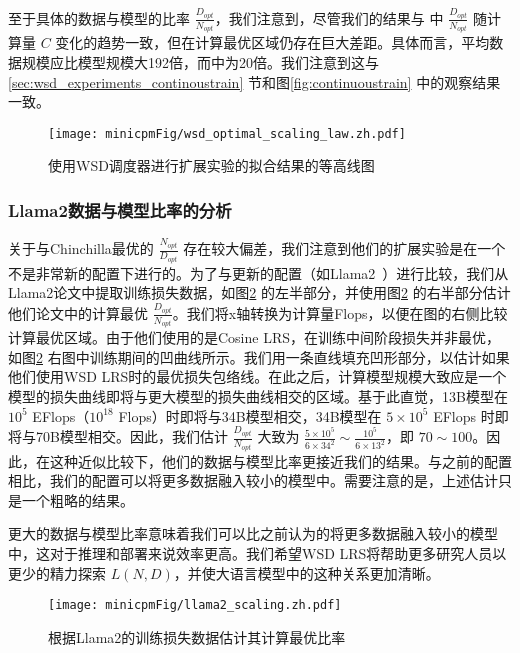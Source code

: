 至于具体的数据与模型的比率 $\frac{D_{opt}}{N_{opt}}$，我们注意到，尽管我们的结果与 \citet{hoffmann2022training} 中 $\frac{D_{opt}}{N_{opt}}$ 随计算量 $C$ 变化的趋势一致，但在计算最优区域仍存在巨大差距。具体而言，平均数据规模应比模型规模大192倍，而\citet{hoffmann2022training}中为20倍。我们注意到这与\ref{sec:wsd_experiments_continoustrain} 节和图\ref{fig:continuoustrain} 中的观察结果一致。




\begin{figure}[!t]
    \centering
    \texttt{[image: minicpmFig/wsd\_optimal\_scaling\_law.zh.pdf]}
    \caption{使用WSD调度器进行扩展实验的拟合结果的等高线图}
    \label{fig:wsd_optimalscalinglaw_contour}
\end{figure}



\subsubsection{Llama2数据与模型比率的分析}
关于与Chinchilla最优的 $\frac{N_{opt}}{D_{opt}}$ 存在较大偏差，我们注意到他们的扩展实验是在一个不是非常新的配置下进行的。为了与更新的配置（如Llama2~\citep{touvron2023llama}）进行比较，我们从Llama2论文中提取训练损失数据，如图\ref{fig:llamascaling} 的左半部分，并使用图\ref{fig:llamascaling} 的右半部分估计他们论文中的计算最优 $\frac{D_{opt}}{N_{opt}}$。我们将x轴转换为计算量Flops，以便在图的右侧比较计算最优区域。由于他们使用的是Cosine LRS，在训练中间阶段损失并非最优，如图\ref{fig:llamascaling} 右图中训练期间的凹曲线所示。我们用一条直线填充凹形部分，以估计如果他们使用WSD LRS时的最优损失包络线。在此之后，计算模型规模大致应是一个模型的损失曲线即将与更大模型的损失曲线相交的区域。基于此直觉，13B模型在 $10^5$ EFlops（$10^{18}$ Flops）时即将与34B模型相交，34B模型在 $5\times 10^5$ EFlops 时即将与70B模型相交。因此，我们估计 $\frac{D_{opt}}{N_{opt}}$ 大致为 $\frac{5\times 10^5}{6\times 34^2} \sim \frac{10^5}{6\times 13^2} $，即 $70 \sim 100$。因此，在这种近似比较下，他们的数据与模型比率更接近我们的结果。与之前的配置相比，我们的配置可以将更多数据融入较小的模型中。需要注意的是，上述估计只是一个粗略的结果。 

更大的数据与模型比率意味着我们可以比之前认为的将更多数据融入较小的模型中，这对于推理和部署来说效率更高。我们希望WSD LRS将帮助更多研究人员以更少的精力探索 $L(N, D)$，并使大语言模型中的这种关系更加清晰。 


\begin{figure}
    \centering
    \texttt{[image: minicpmFig/llama2\_scaling.zh.pdf]}
    \caption{根据Llama2的训练损失数据估计其计算最优比率}
    \label{fig:llamascaling}
\end{figure}




